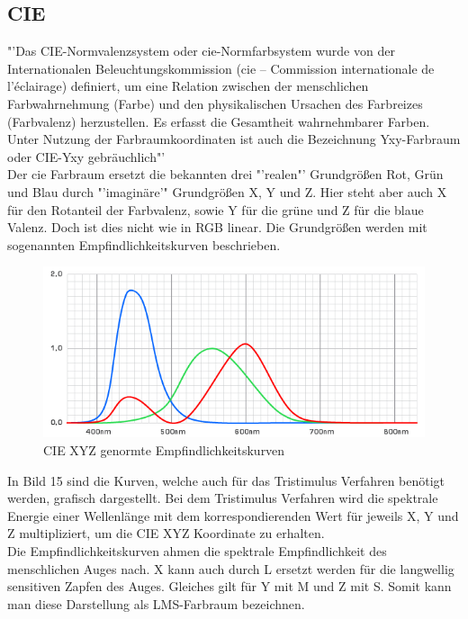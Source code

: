 \documentclass[11pt]{scrartcl}
\begin{document}
\subsection{CIE} \label{section_CIE}
"'Das CIE-Normvalenzsystem oder \ac{cie}-Normfarbsystem wurde von der Internationalen Beleuchtungskommission (\ac{cie} – Commission internationale de l’éclairage)
definiert, um eine Relation zwischen der menschlichen Farbwahrnehmung (Farbe) und den physikalischen Ursachen des Farbreizes (Farbvalenz) herzustellen.
Es erfasst die Gesamtheit wahrnehmbarer Farben. Unter Nutzung der Farbraumkoordinaten ist auch die Bezeichnung Yxy-Farbraum oder CIE-Yxy gebräuchlich"'
\cite{wikipediaCIE}\\
Der \ac{cie} Farbraum ersetzt die bekannten drei "'realen"' Grundgrößen Rot, Grün und Blau durch "'imaginäre'" Grundgrößen X, Y und Z. Hier steht aber auch
X für den Rotanteil der Farbvalenz, sowie Y für die grüne und Z für die blaue Valenz. Doch ist dies nicht wie in RGB linear. Die Grundgrößen werden mit
sogenannten Empfindlichkeitskurven beschrieben.
\begin{figure}[H]
    \begin{center}
        \includegraphics[width=.5\textwidth]{images/cie_tristimul.png}
    \end{center}
    \caption{CIE XYZ genormte Empfindlichkeitskurven \cite{wikipediaCIE}}
\end{figure}
\noindent
In Bild 15 sind die Kurven, welche auch für das Tristimulus Verfahren benötigt werden, grafisch dargestellt. Bei dem Tristimulus Verfahren wird die spektrale Energie
einer Wellenlänge mit dem korrespondierenden Wert für jeweils X, Y und Z multipliziert, um die CIE XYZ Koordinate zu erhalten.\\
Die Empfindlichkeitskurven ahmen die spektrale Empfindlichkeit des menschlichen Auges nach. X kann auch durch L ersetzt werden für die langwellig sensitiven Zapfen
des Auges. Gleiches gilt für Y mit M und Z mit S. Somit kann man diese Darstellung als LMS-Farbraum bezeichnen.
\end{document}
